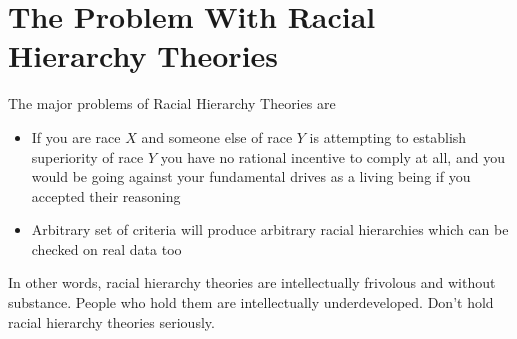 \documentclass{amsart}
\begin{document}
\section{The Problem With Racial Hierarchy Theories}

The major problems of Racial Hierarchy Theories are
\begin{itemize}
\item{If you are race $X$ and someone else of race $Y$ is attempting to establish superiority of race $Y$ you have no rational incentive to comply at all, and you would be going against your fundamental drives as a living being if you accepted their reasoning}
\item{Arbitrary set of criteria will produce arbitrary racial hierarchies which can be checked on real data too}
\end{itemize}

In other words, racial hierarchy theories are intellectually frivolous and without substance.  People who hold them are intellectually underdeveloped.  Don't hold racial hierarchy theories seriously.
\end{document}
